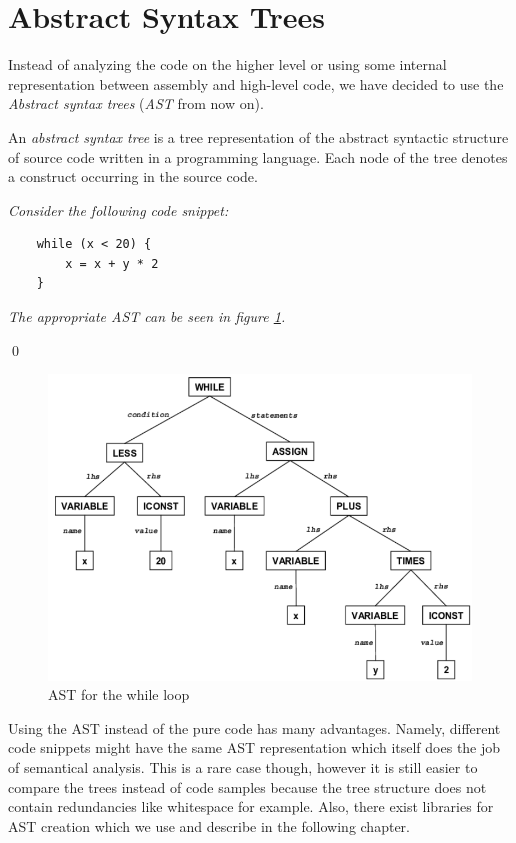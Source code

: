 \section{Abstract Syntax Trees}
\label{sec:AST}

Instead of analyzing the code on the higher level or using some internal representation between assembly and high-level code, we have decided to use the \emph{Abstract syntax trees} (\emph{AST} from now on).

\begin{defn}
    An \emph{abstract syntax tree} is a tree representation of the abstract syntactic structure of source code written in a programming language. Each node of the tree denotes a construct occurring in the source code.
\end{defn}

\begin{exmp}
    \textit{Consider the following code snippet:}

    \begin{lstlisting}
    while (x < 20) {
        x = x + y * 2
    }
    \end{lstlisting}

    \textit{The appropriate AST can be seen in figure \ref{fig:WhileAST}.}

\qed
\end{exmp}

\begin{figure}
    \centering
    \includegraphics[scale=0.6]{res/WhileAST.PNG}
    \caption{AST for the while loop}
    \label{fig:WhileAST}
\end{figure}

Using the AST instead of the pure code has many advantages. Namely, different code snippets might have the same AST representation which itself does the job of semantical analysis. This is a rare case though, however it is still easier to compare the trees instead of code samples because the tree structure does not contain redundancies like whitespace for example. Also, there exist libraries for AST creation which we use and describe in the following chapter.
